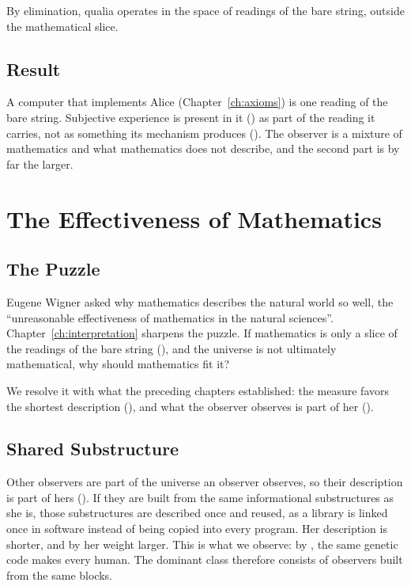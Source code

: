 \documentclass[11pt]{book}
\begin{document}
\begin{deduction}\label{ded:qualia}
  By elimination, qualia operates in the space of readings of the bare
  string, outside the mathematical slice.
\end{deduction}


\section{Result}

A computer that implements Alice (Chapter~\ref{ch:axioms}) is one reading
of the bare string. Subjective experience is present in it
() as part of the reading it carries, not as something
its mechanism produces (). The observer is a
mixture of mathematics and what mathematics does not describe, and the
second part is by far the larger.



\chapter{The Effectiveness of Mathematics}
\label{ch:mathematics}

\section{The Puzzle}
\label{sec:puzzle}

Eugene Wigner asked why mathematics describes the natural world so well,
the ``unreasonable effectiveness of mathematics in the natural sciences''.
Chapter~\ref{ch:interpretation} sharpens the puzzle. If mathematics is only
a slice of the readings of the bare string (), and the
universe is not ultimately mathematical, why should mathematics fit it?

We resolve it with what the preceding chapters established: the measure
favors the shortest description (), and what the observer
observes is part of her ().


\section{Shared Substructure}
\label{sec:shared}

Other observers are part of the universe an observer observes, so their
description is part of hers (). If they are built from the
same informational substructures as she is, those substructures are
described once and reused, as a library is linked once in software instead
of being copied into every program. Her description is shorter, and by
 her weight larger. This is what we observe: by
, the same genetic code makes every human. The dominant
class therefore consists of observers built from the same blocks.
\end{document}
